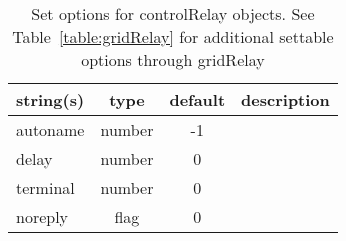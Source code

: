 \begin{table}[ht]
\centering
\begin{tabular}{p{5cm} c c p{7cm}}
\hline
string(s) & type & default & description \\
\hline
autoname & number & -1 & \\
delay & number & 0 & \\
terminal & number & 0 & \\
noreply & flag & 0 & \\
\hline
\end{tabular}
\caption{Set options for controlRelay objects. See Table~\ref{table:gridRelay} for additional settable options through gridRelay}
\label{table:controlRelay}
\end{table}

